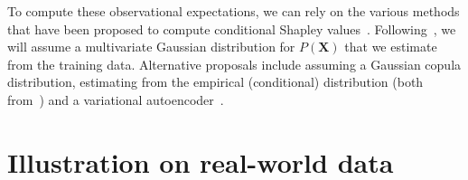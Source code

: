 \documentclass{article}
\newcommand{\vX}{\mathbf{X}}
\newcommand{\vx}{\mathbf{x}}
\newcommand{\dodo}{\mathit{do}}
\newcommand{\lvdo}[1]{\dodo(\vX_{#1} = \vx_{#1})}
\newcommand{\spa}{\mathop{\textit{\scriptsize pa}}}
\newcommand{\onder}[2]{{#1}_{\mbox{\scriptsize #2}}}
\newcommand{\isequal}{\hspace*{-2.5mm} & = & \hspace*{-2.5mm}}
\newcommand{\chaincomponents}{{\cal T}}
\newcommand{\comment}[1]{{\color{red} #1}}
\begin{document}
%
%
%
%
%
%


To compute these observational expectations, we can rely on the various methods that have been proposed to compute conditional Shapley values~\cite{aas2019explaining,frye2019asymmetric}. Following~\cite{aas2019explaining}, we will assume a multivariate Gaussian distribution for $P(\vX)$ that we estimate from the training data. Alternative proposals include assuming a Gaussian copula distribution, estimating from the empirical (conditional) distribution (both from~\cite{aas2019explaining}) and a variational autoencoder~\cite{frye2019asymmetric}.

\section{Illustration on real-world data}
\end{document}
